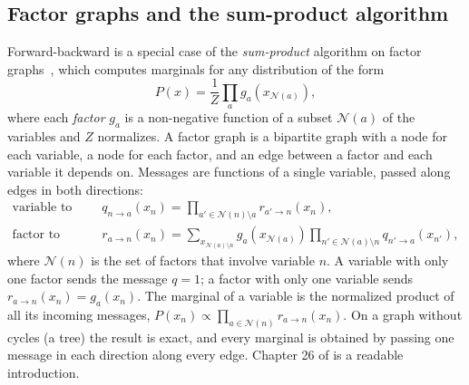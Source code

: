 \subsection{Factor graphs and the sum-product algorithm}

Forward-backward is a special case of the \emph{sum-product} algorithm on factor graphs~\citep{kschischang2001}, which computes marginals for any distribution of the form
\begin{equation}
  P(x) = \frac{1}{Z}\prod_{a}g_a(x_{\mathcal{N}(a)}),
\end{equation}
where each \emph{factor} $g_a$ is a non-negative function of a subset $\mathcal{N}(a)$ of the variables and $Z$ normalizes. A factor graph is a bipartite graph with a node for each variable, a node for each factor, and an edge between a factor and each variable it depends on. Messages are functions of a single variable, passed along edges in both directions:
\begin{align}
  \text{variable to factor:}\quad & q_{n\to a}(x_n) = \prod_{a'\in\mathcal{N}(n)\setminus a} r_{a'\to n}(x_n), \\
  \text{factor to variable:}\quad & r_{a\to n}(x_n) = \sum_{x_{\mathcal{N}(a)\setminus n}} g_a(x_{\mathcal{N}(a)}) \prod_{n'\in\mathcal{N}(a)\setminus n} q_{n'\to a}(x_{n'}),
\end{align}
where $\mathcal{N}(n)$ is the set of factors that involve variable $n$. A variable with only one factor sends the message $q=1$; a factor with only one variable sends $r_{a\to n}(x_n)=g_a(x_n)$. The marginal of a variable is the normalized product of all its incoming messages, $P(x_n)\propto\prod_{a\in\mathcal{N}(n)}r_{a\to n}(x_n)$. On a graph without cycles (a tree) the result is exact, and every marginal is obtained by passing one message in each direction along every edge. Chapter 26 of \citet{mackay2003} is a readable introduction.

